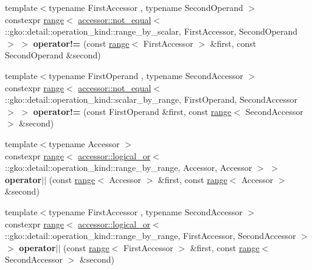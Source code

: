 \begin{DoxyCompactItemize}
\item 
\mbox{\label{namespacegko_a6f677bbc94cc91eb9edf9c55e6f3bec0}} 
{\footnotesize template$<$typename First\+Accessor , typename Second\+Operand $>$ }\\constexpr \hyperlink{classgko_1_1range}{range}$<$ \hyperlink{structgko_1_1accessor_1_1not__equal}{accessor\+::not\+\_\+equal}$<$ \+::gko\+::detail\+::operation\+\_\+kind\+::range\+\_\+by\+\_\+scalar, First\+Accessor, Second\+Operand $>$ $>$ {\bfseries operator!=} (const \hyperlink{classgko_1_1range}{range}$<$ First\+Accessor $>$ \&first, const Second\+Operand \&second)
\item 
\mbox{\label{namespacegko_aca70088d495ea60993e6bf86d155571c}} 
{\footnotesize template$<$typename First\+Operand , typename Second\+Accessor $>$ }\\constexpr \hyperlink{classgko_1_1range}{range}$<$ \hyperlink{structgko_1_1accessor_1_1not__equal}{accessor\+::not\+\_\+equal}$<$ \+::gko\+::detail\+::operation\+\_\+kind\+::scalar\+\_\+by\+\_\+range, First\+Operand, Second\+Accessor $>$ $>$ {\bfseries operator!=} (const First\+Operand \&first, const \hyperlink{classgko_1_1range}{range}$<$ Second\+Accessor $>$ \&second)
\item 
\mbox{\label{namespacegko_a5409d98fe2fc4ae364dab8e6a76d4016}} 
{\footnotesize template$<$typename Accessor $>$ }\\constexpr \hyperlink{classgko_1_1range}{range}$<$ \hyperlink{structgko_1_1accessor_1_1logical__or}{accessor\+::logical\+\_\+or}$<$ \+::gko\+::detail\+::operation\+\_\+kind\+::range\+\_\+by\+\_\+range, Accessor, Accessor $>$ $>$ {\bfseries operator$\vert$$\vert$} (const \hyperlink{classgko_1_1range}{range}$<$ Accessor $>$ \&first, const \hyperlink{classgko_1_1range}{range}$<$ Accessor $>$ \&second)
\item 
\mbox{\label{namespacegko_a90d30de07b0c483d6c25cd9ac7f27487}} 
{\footnotesize template$<$typename First\+Accessor , typename Second\+Accessor $>$ }\\constexpr \hyperlink{classgko_1_1range}{range}$<$ \hyperlink{structgko_1_1accessor_1_1logical__or}{accessor\+::logical\+\_\+or}$<$ \+::gko\+::detail\+::operation\+\_\+kind\+::range\+\_\+by\+\_\+range, First\+Accessor, Second\+Accessor $>$ $>$ {\bfseries operator$\vert$$\vert$} (const \hyperlink{classgko_1_1range}{range}$<$ First\+Accessor $>$ \&first, const \hyperlink{classgko_1_1range}{range}$<$ Second\+Accessor $>$ \&second)

\end{DoxyCompactItemize}
